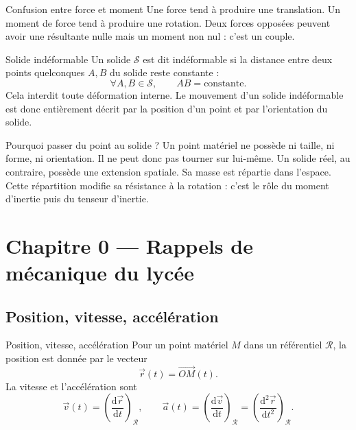 \documentclass[11pt,a4paper]{article}
\newcommand{\vect}[1]{\overrightarrow{#1}}
\newcommand{\der}[2]{\frac{\mathrm{d}#1}{\mathrm{d}#2}}
\newcommand{\dder}[2]{\frac{\mathrm{d}^2#1}{\mathrm{d}#2^2}}
\newcommand{\Rep}{\mathcal R}
\newcommand{\Solide}{\mathcal S}
\begin{document}
\begin{warningbox}{Confusion entre force et moment}{}
Une force tend à produire une translation. Un moment de force tend à produire une rotation.
Deux forces opposées peuvent avoir une résultante nulle mais un moment non nul : c'est un couple.
\end{warningbox}

\begin{definitionbox}{Solide indéformable}{}
Un solide $\Solide$ est dit indéformable si la distance entre deux points quelconques $A,B$ du solide reste constante :
\[
\forall A,B\in\Solide,\qquad AB=\text{constante}.
\]
Cela interdit toute déformation interne. Le mouvement d'un solide indéformable est donc entièrement décrit par la position d'un point et par l'orientation du solide.
\end{definitionbox}

\begin{intuitionbox}{Pourquoi passer du point au solide ?}{}
Un point matériel ne possède ni taille, ni forme, ni orientation. Il ne peut donc pas tourner sur lui-même.
Un solide réel, au contraire, possède une extension spatiale. Sa masse est répartie dans l'espace.
Cette répartition modifie sa résistance à la rotation : c'est le rôle du moment d'inertie puis du tenseur d'inertie.
\end{intuitionbox}

\section{Chapitre 0 — Rappels de mécanique du lycée}

\subsection{Position, vitesse, accélération}

\begin{definitionbox}{Position, vitesse, accélération}{}
Pour un point matériel $M$ dans un référentiel $\Rep$, la position est donnée par le vecteur
\[
\vec r(t)=\vect{OM}(t).
\]
La vitesse et l'accélération sont
\[
\vec v(t)=\left(\der{\vec r}{t}\right)_{\Rep},
\qquad
\vec a(t)=\left(\der{\vec v}{t}\right)_{\Rep}
=\left(\dder{\vec r}{t}\right)_{\Rep}.
\]
\end{definitionbox}

\begin{center}
\end{center}
\end{document}

